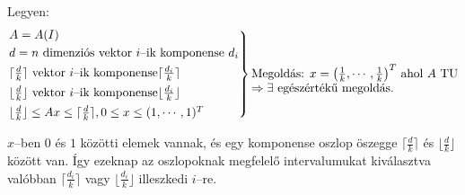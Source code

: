 Legyen:
\[\begin{rcases}
A=A(I) \\
d = n \text{ dimenziós vektor } i \text{--ik komponense } d_i \\
\lceil \frac{d}{k} \rceil \text{ vektor } i \text{--ik komponense} \lceil \frac{d_i}{k} \rceil \\
\lfloor \frac{d}{k} \rfloor \text{ vektor } i \text{--ik komponense} \lfloor \frac{d_i}{k} \rfloor \\
\lfloor \frac{d}{k} \rfloor \leq Ax \leq \lceil \frac{d}{k} \rceil, 0 \leq x \leq (1,\cdots, 1)^T
\end{rcases} \parbox[t]{6cm}{Megoldás: $x=\left( \frac{1}{k}, \cdots, \frac{1}{k} \right)^T$ ahol $A$
TU $\Rightarrow \exists$ egészértékű megoldás.} 
\]

$x$--ben $0$ és $1$ közötti elemek vannak, és egy komponense oszlop öszegge
$\lceil \frac{d}{k} \rceil$ és $ \lfloor \frac{d}{k} \rfloor$ között van. Így
ezeknap az oszlopoknak megfelelő intervalumukat kiválasztva valóbban $\lceil
\frac{d_i}{k} \rceil$ vagy $ \lfloor \frac{d_i}{k} \rfloor$ illeszkedi $i$--re.